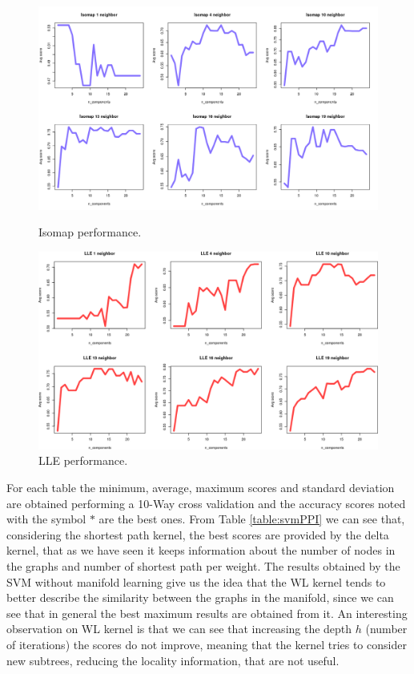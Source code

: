 \documentclass[11pt,a4paper]{article}
\begin{document}
\begin{figure}[H]
	\begin{minipage}[t]{0.5\linewidth}
		\centering
		\includegraphics[width=1\textwidth]{img/Isomapwl_plots.png}
		\caption{Isomap performance.}
		\label{svmIsoSP}
	\end{minipage}
	\hspace{0.1cm}
	\begin{minipage}[t]{0.5\linewidth} 
		\centering
		\includegraphics[width=1\textwidth]{img/LLEwl_plots.png}
		\caption{LLE performance.}
		\label{svmLLESP}
	\end{minipage}        
\end{figure}
For each table the minimum, average, maximum scores and standard deviation are obtained performing a 10-Way cross validation and the accuracy scores noted with the symbol $*$ are the best ones.
From Table \ref{table:svmPPI} we can see that, considering the shortest path kernel, the best scores are provided by the delta kernel, that as we have seen it keeps information about the number of nodes in the graphs and number of shortest path per weight. The results obtained by the SVM without manifold learning give us the idea that the WL kernel tends to better describe the similarity between the graphs in the manifold, since we can see that in general the best maximum results are obtained from it. An interesting observation on WL kernel is that we can see that increasing the depth $h$ (number of iterations) the scores do not improve, meaning that the kernel tries to consider new subtrees, reducing the locality information, that are not useful.\\
\end{document}
